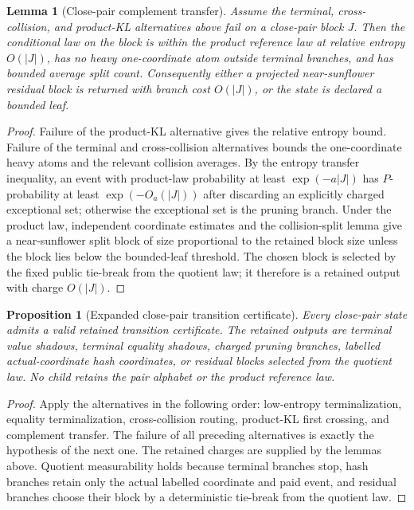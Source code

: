 \documentclass[11pt]{article}
\newtheorem{lemma}[theorem]{Lemma}
\newtheorem{proposition}[theorem]{Proposition}
\theoremstyle{remark}
\begin{document}
\begin{lemma}[Close-pair complement transfer]\label{lem:app-complement-transfer}
Assume the terminal, cross-collision, and product-KL alternatives above fail on a close-pair block $J$.  Then the conditional law on the block is within the product reference law at relative entropy $O(|J|)$, has no heavy one-coordinate atom outside terminal branches, and has bounded average split count.  Consequently either a projected near-sunflower residual block is returned with branch cost $O(|J|)$, or the state is declared a bounded leaf.
\end{lemma}

\begin{proof}
Failure of the product-KL alternative gives the relative entropy bound.  Failure of the terminal and cross-collision alternatives bounds the one-coordinate heavy atoms and the relevant collision averages.  By the entropy transfer inequality, an event with product-law probability at least $\exp(-a|J|)$ has $P$-probability at least $\exp(-O_a(|J|))$ after discarding an explicitly charged exceptional set; otherwise the exceptional set is the pruning branch.  Under the product law, independent coordinate estimates and the collision-split lemma give a near-sunflower split block of size proportional to the retained block size unless the block lies below the bounded-leaf threshold.  The chosen block is selected by the fixed public tie-break from the quotient law; it therefore is a retained output with charge $O(|J|)$.
\end{proof}

\begin{proposition}[Expanded close-pair transition certificate]\label{prop:app-close-pair-certificate}
Every close-pair state admits a valid retained transition certificate.  The retained outputs are terminal value shadows, terminal equality shadows, charged pruning branches, labelled actual-coordinate hash coordinates, or residual blocks selected from the quotient law.  No child retains the pair alphabet or the product reference law.
\end{proposition}

\begin{proof}
Apply the alternatives in the following order: low-entropy terminalization, equality terminalization, cross-collision routing, product-KL first crossing, and complement transfer.  The failure of all preceding alternatives is exactly the hypothesis of the next one.  The retained charges are supplied by the lemmas above.  Quotient measurability holds because terminal branches stop, hash branches retain only the actual labelled coordinate and paid event, and residual branches choose their block by a deterministic tie-break from the quotient law.
\end{proof}
\end{document}
